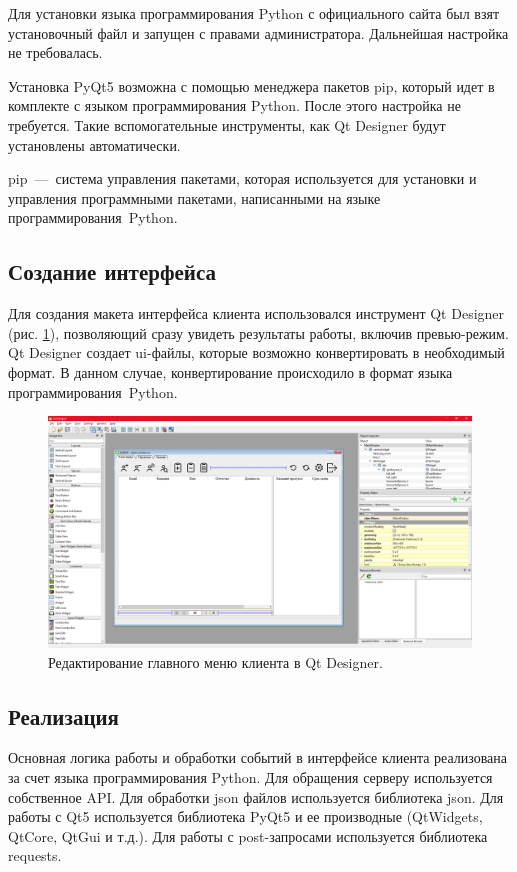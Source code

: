 Для установки языка программирования Python с официального сайта был взят установочный файл и запущен с правами администратора. Дальнейшая настройка не требовалась.

Установка PyQt5 возможна с помощью менеджера пакетов pip, который идет в комплекте с языком программирования Python. После этого настройка не требуется. Такие вспомогательные инструменты, как Qt Designer будут установлены автоматически.

pip --- система управления пакетами, которая используется для установки и управления программными пакетами, написанными на языке программирования Python.


\clearpage
\subsection{Создание интерфейса}
Для создания макета интерфейса клиента использовался инструмент Qt Designer (рис. \ref{fig:qtdesigner}), позволяющий сразу увидеть результаты работы, включив превью-режим. Qt Designer создает ui-файлы, которые возможно конвертировать в необходимый формат. В данном случае, конвертирование происходило в формат языка программирования Python.

\begin{figure}[h]
    \centering
    \includegraphics[width=1\linewidth]{img/qtdesigner.png}
    \caption{Редактирование главного меню клиента в Qt Designer.}
    \label{fig:qtdesigner}
\end{figure}


\clearpage
\subsection{Реализация}
Основная логика работы и обработки событий в интерфейсе клиента реализована за счет языка программирования Python. Для обращения серверу используется собственное API. Для обработки json файлов используется библиотека json. Для работы с Qt5 используется библиотека PyQt5 и ее производные (QtWidgets, QtCore, QtGui и т.д.). Для работы с post-запросами используется библиотека requests.


